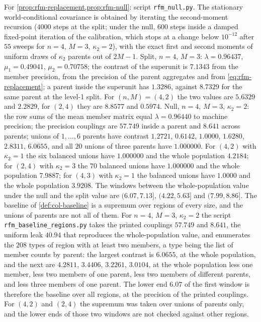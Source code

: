 \begin{numcheck}\label{chk:rfm-null}
For \cref{prop:rfm-replacement,prop:rfm-null}: script \texttt{rfm\_\allowbreak null.py}. The stationary world-conditional covariance is obtained by iterating the second-moment recursion ($4000$ steps at the split; under the null, $600$ steps inside a damped fixed-point iteration of the calibration, which stops at a change below $10^{-12}$ after $55$ sweeps for $n=4$, $M=3$, $\kappa_2=2$), with the exact first and second moments of uniform draws of $\kappa_2$ parents out of $2M-1$. Split, $n=4$, $M=3$: $\lambda=0.96437$, $\mu_1=0.49041$, $\mu_2=0.70758$; the contrast of the superunit is $7.1343$ from the member precision, from the precision of the parent aggregates and from \eqref{eq:rfm-replacement}; a parent inside the superunit has $1.3286$, against $8.7329$ for the same parent at the level-1 split. For $(n,M)=(4,2)$ the two values are $5.6329$ and $2.2829$, for $(2,4)$ they are $8.8577$ and $0.5974$. Null, $n=4$, $M=3$, $\kappa_2=2$: the row sums of the mean member matrix equal $\lambda=0.96440$ to machine precision; the precision couplings are $57.749$ inside a parent and $8.641$ across parents; unions of $1,\dots,6$ parents have contrast $1.2721$, $0.6142$, $1.0000$, $1.6280$, $2.8311$, $6.0655$, and all $20$ unions of three parents have $1.000000$. For $(4,2)$ with $\kappa_2=1$ the six balanced unions have $1.000000$ and the whole population $4.2184$; for $(2,4)$ with $\kappa_2=3$ the $70$ balanced unions have $1.000000$ and the whole population $7.9887$; for $(4,3)$ with $\kappa_2=1$ the balanced unions have $1.0000$ and the whole population $3.9208$. The windows between the whole-population value under the null and the split value are $(6.07,7.13]$, $(4.22,5.63]$ and $(7.99,8.86]$. The baseline of \cref{def:col-baseline} is a supremum over regions of every size, and the unions of parents are not all of them. For $n=4$, $M=3$, $\kappa_2=2$ the script \texttt{rfm\_\allowbreak baseline\_\allowbreak regions.py} takes the printed couplings $57.749$ and $8.641$, the uniform leak $40.94$ that reproduces the whole-population value, and enumerates the $208$ types of region with at least two members, a type being the list of member counts by parent: the largest contrast is $6.0655$, at the whole population, and the next are $4.2811$, $3.4406$, $3.2261$, $3.0104$, at the whole population less one member, less two members of one parent, less two members of different parents, and less three members of one parent. The lower end $6.07$ of the first window is therefore the baseline over all regions, at the precision of the printed couplings. For $(4,2)$ and $(2,4)$ the supremum was taken over unions of parents only, and the lower ends of those two windows are not checked against other regions.
\end{numcheck}

